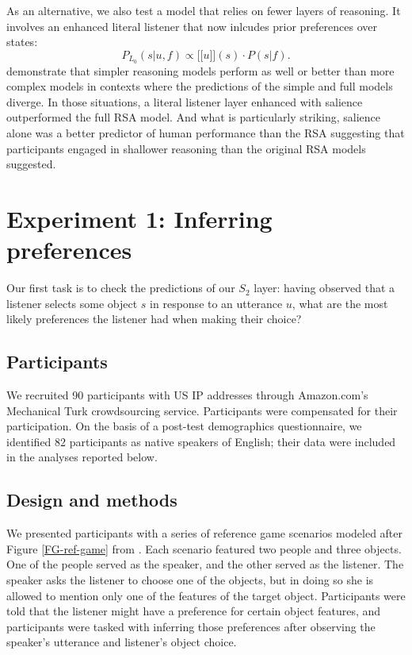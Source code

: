 \documentclass[10pt,a4paper]{article}
\newcommand{\sem}[1]{\mbox{$[\![$#1$]\!]$}}
\begin{document}
As an alternative, we also test a model that relies on fewer layers of reasoning. It involves an enhanced literal listener that now inlcudes prior preferences over states:
$$P_{L_{0}}(s|u,f) \propto \sem{$u$}(s) \cdot P(s|f).$$
 demonstrate that simpler reasoning models perform as well or better than more complex models in contexts where the predictions of the simple and full models diverge. In those situations, a literal listener layer enhanced with salience outperformed the full RSA model. And what is particularly striking, salience alone was a better predictor of human performance than the RSA suggesting that participants engaged in shallower reasoning than the original RSA models suggested.  

\section{Experiment 1: Inferring preferences}

Our first task is to check the predictions of our $S_2$ layer: having observed that a listener selects some object $s$ in response to an utterance $u$, what are the most likely preferences the listener had when making their choice? 

\subsection{Participants}

We recruited 90 participants with US IP addresses through Amazon.com's Mechanical Turk crowdsourcing service. Participants were compensated for their participation. On the basis of a post-test demographics questionnaire, we identified 82 participants as native speakers of English; their data were included in the analyses reported below.

\subsection{Design and methods}

We presented participants with a series of reference game scenarios modeled after Figure \ref{FG-ref-game} from . Each scenario featured two people and three objects. One of the people served as the speaker, and the other served as the listener. The speaker asks the listener to choose one of the objects, but in doing so she is allowed to mention only one of the features of the target object. Participants were told that the listener might have a preference for certain object features, and participants were tasked with inferring those preferences after observing the speaker's utterance and listener's object choice.
\end{document}
